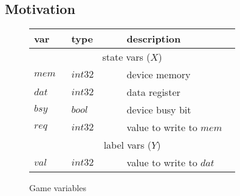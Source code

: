 \documentclass[a4paper,twoside,openright,11pt]{book}
\theoremstyle{definition}
\begin{document}
\subsection{Motivation}

\begin{figure}
    \caption{Game variables}
    \begin{tabular}{|p{0.13\linewidth}p{0.22\linewidth}p{0.45\linewidth}|}
        \hline
        {\bf var} & {\bf type} & {\bf description} \\
        \hline\hline
        \multicolumn{3}{|c|}{state vars ($X$)} \\
        \hline
        $mem$ & $int32$ & device memory           \\
        $dat$ & $int32$ & data register           \\
        $bsy$ & $bool$  & device busy bit         \\
        $req$ & $int32$ & value to write to $mem$ \\
        \hline\hline
        \multicolumn{3}{|c|}{label vars ($Y$)}    \\
        \hline
        $val$ & $int32$ & value to write to $dat$ \\
        \hline
    \end{tabular}
\end{figure}
\end{document}
